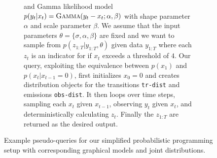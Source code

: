 \begin{figure}[p]
\begin{subfigure}[t]{\textwidth}
{				and Gamma likelihood model $p(y_t | x_t) = \textsc{Gamma}(y_t-x_t ; \alpha, \beta)$ with
				shape parameter $\alpha$ and scale parameter $\beta$.  We assume that the input
				parameters $\theta = \{\sigma,\alpha,\beta\}$ are fixed and we want
				to sample from $p(z_{1:T} | y_{1:T}, \theta)$ given data $y_{1:T}$ where each 
				$z_t$ is an indicator for if $x_{t}$ exceeds a threshold of $4$. Our query, exploiting the
				equivalence between $p(x_1)$ and $p(x_t|x_{t-1}=0)$, first initializes $x_0=0$ and creates
				distribution objects for the transitions \lstinline$tr-dist$\xspace and emissions
				\lstinline$obs-dist$\xspace.  It then loops over time steps, sampling each $x_t$ given
				$x_{t-1}$, observing $y_t$ given $x_t$, and deterministically calculating $z_t$.  Finally
				the $z_{1:T}$ are returned as the desired output.
				\label{fig:probprog:LGSSM}
				}
		\end{subfigure}
\caption{Example pseudo-queries for our simplified probabilistic programming setup with
	corresponding graphical models and joint distributions.\label{fig:probprog:example-progs}}
\end{figure}

